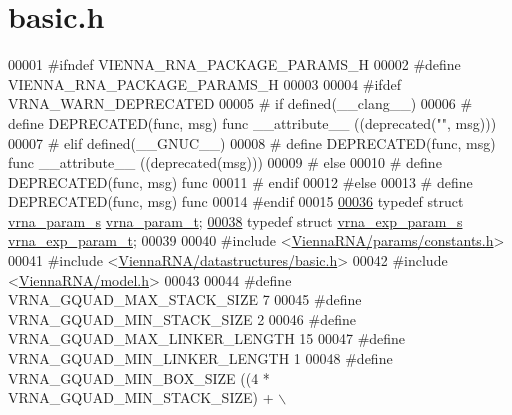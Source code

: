 \hypertarget{params_2basic_8h_source}{}\section{basic.\+h}
\label{params_2basic_8h_source}

\begin{DoxyCode}
00001 \textcolor{preprocessor}{#ifndef VIENNA\_RNA\_PACKAGE\_PARAMS\_H}
00002 \textcolor{preprocessor}{#define VIENNA\_RNA\_PACKAGE\_PARAMS\_H}
00003 
00004 \textcolor{preprocessor}{#ifdef VRNA\_WARN\_DEPRECATED}
00005 \textcolor{preprocessor}{# if defined(\_\_clang\_\_)}
00006 \textcolor{preprocessor}{#  define DEPRECATED(func, msg) func \_\_attribute\_\_ ((deprecated("", msg)))}
00007 \textcolor{preprocessor}{# elif defined(\_\_GNUC\_\_)}
00008 \textcolor{preprocessor}{#  define DEPRECATED(func, msg) func \_\_attribute\_\_ ((deprecated(msg)))}
00009 \textcolor{preprocessor}{# else}
00010 \textcolor{preprocessor}{#  define DEPRECATED(func, msg) func}
00011 \textcolor{preprocessor}{# endif}
00012 \textcolor{preprocessor}{#else}
00013 \textcolor{preprocessor}{# define DEPRECATED(func, msg) func}
00014 \textcolor{preprocessor}{#endif}
00015 
\hyperlink{group__energy__parameters_ga8a69ca7d787e4fd6079914f5343a1f35}{00036} \textcolor{keyword}{typedef} \textcolor{keyword}{struct  }\hyperlink{group__energy__parameters_structvrna__param__s}{vrna\_param\_s} \hyperlink{group__energy__parameters_structvrna__param__s}{vrna\_param\_t};
\hyperlink{group__energy__parameters_ga01d8b92fe734df8d79a6169482c7d8d8}{00038} \textcolor{keyword}{typedef} \textcolor{keyword}{struct  }\hyperlink{group__energy__parameters_structvrna__exp__param__s}{vrna\_exp\_param\_s} \hyperlink{group__energy__parameters_structvrna__exp__param__s}{vrna\_exp\_param\_t};
00039 
00040 \textcolor{preprocessor}{#include <\hyperlink{constants_8h}{ViennaRNA/params/constants.h}>}
00041 \textcolor{preprocessor}{#include <\hyperlink{datastructures_2basic_8h}{ViennaRNA/datastructures/basic.h}>}
00042 \textcolor{preprocessor}{#include <\hyperlink{model_8h}{ViennaRNA/model.h}>}
00043 
00044 \textcolor{preprocessor}{#define   VRNA\_GQUAD\_MAX\_STACK\_SIZE     7}
00045 \textcolor{preprocessor}{#define   VRNA\_GQUAD\_MIN\_STACK\_SIZE     2}
00046 \textcolor{preprocessor}{#define   VRNA\_GQUAD\_MAX\_LINKER\_LENGTH  15}
00047 \textcolor{preprocessor}{#define   VRNA\_GQUAD\_MIN\_LINKER\_LENGTH  1}
00048 \textcolor{preprocessor}{#define   VRNA\_GQUAD\_MIN\_BOX\_SIZE       ((4 * VRNA\_GQUAD\_MIN\_STACK\_SIZE) + \(\backslash\)}

\end{DoxyCode}
